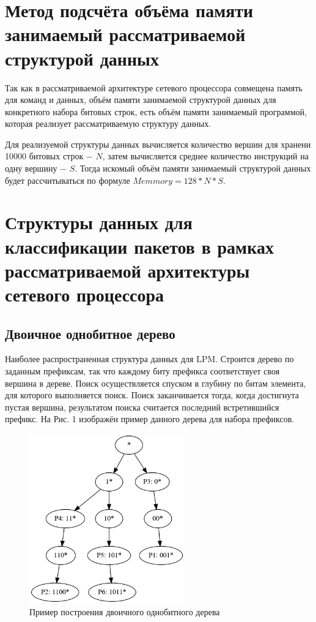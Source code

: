 \documentclass[a4peper, 12pt, titlepage, finall]{report}
\begin{document}
    \section{Метод подсчёта объёма памяти занимаемый рассматриваемой структурой данных}
        Так как в рассматриваемой архитектуре сетевого процессора совмещена память для команд и данных, объём памяти занимаемой структурой данных 
        для конкретного набора битовых строк, есть объём памяти занимаемый программой, которая реализует рассматриваемую структуру данных.

        Для реализуемой структуры данных вычисляется количество вершин для хранени 10000 битовых строк $-$ $N$, затем вычисляется среднее количество инструкций на 
        одну вершину $-$ $S$. Тогда искомый объём памяти занимаемый структурой данных будет рассчитываться по формуле $Memmory = 128 * N * S$.
    \section{Структуры данных для классификации пакетов в рамках рассматриваемой архитектуры сетевого процессора}
        \subsection{Двоичное однобитное дерево}
            Наиболее распространенная структура данных для LPM\@. Строится дерево по заданным префиксам,
            так что каждому биту префикса соответствует своя вершина в дереве. 
            Поиск осуществляется спуском в глубину по битам элемента, для которого выполняется поиск. 
            Поиск заканчивается тогда, когда достигнута пустая вершина, результатом поиска считается последний встретившийся префикс. 
            На Рис. 1 изображён пример данного дерева для набора префиксов.

            \begin{figure}[h]      
                \centering 
                \includegraphics[width=0.6\textwidth]{binary.png}
                \caption{Пример построения двоичного однобитного дерева}\label{fig:mesh1}
            \end{figure}
            
\end{document}

